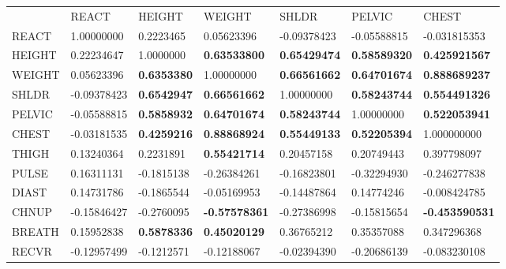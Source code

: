 \documentclass[10pt]{article}
\begin{document}
\begin{table}[H]
\centering
\tiny
\begin{tabular}{lllllll}
       & REACT                 & HEIGHT                & WEIGHT               & SHLDR                & PELVIC              & CHEST                 \\
REACT  & 1.00000000            & 0.2223465             & 0.05623396           & -0.09378423          & -0.05588815         & -0.031815353          \\
HEIGHT & 0.22234647            & 1.0000000             & \textbf{0.63533800}  & \textbf{0.65429474}  & \textbf{0.58589320} & \textbf{0.425921567}  \\
WEIGHT & 0.05623396            & \textbf{0.6353380}    & 1.00000000           & \textbf{0.66561662}  & \textbf{0.64701674} & \textbf{0.888689237}  \\
SHLDR  & -0.09378423           & \textbf{0.6542947}    & \textbf{0.66561662}  & 1.00000000           & \textbf{0.58243744} & \textbf{0.554491326}  \\
PELVIC & -0.05588815           & \textbf{0.5858932}    & \textbf{0.64701674}  & \textbf{0.58243744}  & 1.00000000          & \textbf{0.522053941}  \\
CHEST  & -0.03181535           & \textbf{0.4259216}    & \textbf{0.88868924}  & \textbf{0.55449133}  & \textbf{0.52205394} & 1.000000000           \\
THIGH  & 0.13240364            & 0.2231891             & \textbf{0.55421714}  & 0.20457158           & 0.20749443          & 0.397798097           \\
PULSE  & 0.16311131            & -0.1815138            & -0.26384261          & -0.16823801          & -0.32294930         & -0.246277838          \\
DIAST  & 0.14731786            & -0.1865544            & -0.05169953          & -0.14487864          & 0.14774246          & -0.008424785          \\
CHNUP  & -0.15846427           & -0.2760095            & \textbf{-0.57578361} & -0.27386998          & -0.15815654         & \textbf{-0.453590531} \\
BREATH & 0.15952838            & \textbf{0.5878336}    & \textbf{0.45020129}  & 0.36765212           & 0.35357088          & 0.347296368           \\
RECVR  & -0.12957499           & -0.1212571            & -0.12188067          & -0.02394390          & -0.20686139         & -0.083230108          \\

\end{tabular}
\end{table}
\end{document}
